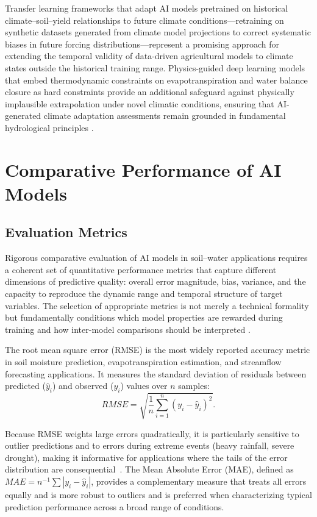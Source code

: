 \documentclass[land,review,accept,pdftex,oneauthor]{Definitions/mdpi}
\begin{document}
Transfer learning frameworks that adapt AI models pretrained on historical climate--soil--yield relationships to future climate conditions---retraining on synthetic datasets generated from climate model projections to correct systematic biases in future forcing distributions---represent a promising approach for extending the temporal validity of data-driven agricultural models to climate states outside the historical training range. Physics-guided deep learning models that embed thermodynamic constraints on evapotranspiration and water balance closure as hard constraints provide an additional safeguard against physically implausible extrapolation under novel climatic conditions, ensuring that AI-generated climate adaptation assessments remain grounded in fundamental hydrological principles \citep{willard2022integrating}.

\section{{Comparative Performance of AI Models}}\label{sec6}

\subsection{Evaluation Metrics}

Rigorous comparative evaluation of AI models in soil--water applications requires a coherent set of quantitative performance metrics that capture different dimensions of predictive quality: overall error magnitude, bias, variance, and the capacity to reproduce the dynamic range and temporal structure of target variables. The selection of appropriate metrics is not merely a technical formality but fundamentally conditions which model properties are rewarded during training and how inter-model comparisons should be interpreted \citep{moges2021review}.

The root mean square error (RMSE) is the most widely reported accuracy metric in soil moisture prediction, evapotranspiration estimation, and streamflow forecasting applications. It measures the standard deviation of residuals between predicted ($\hat{y}_i$) and observed ($y_i$) values over $n$ samples:
\begin{equation}
RMSE=\sqrt{\frac{1}{n}\sum_{i=1}^{n}(y_i-\hat{y}_i)^2}.
\end{equation}

Because RMSE weights large errors quadratically, it is particularly sensitive to outlier predictions and to errors during extreme events (heavy rainfall, severe drought), making it informative for applications where the tails of the error distribution are consequential~\citep{moges2021review}. The Mean Absolute Error (MAE), defined as $MAE = n^{-1}\sum|y_i - \hat{y}_i|$, provides a complementary measure that treats all errors equally and is more robust to outliers and is preferred when characterizing typical prediction performance across a broad range of conditions.
\end{document}
